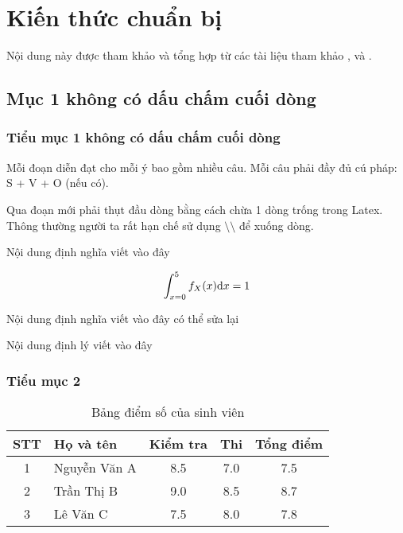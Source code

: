 \chapter{Kiến thức chuẩn bị}
Nội dung này được tham khảo và tổng hợp từ các tài liệu tham khảo \cite{nguyen1999}, \cite{tran_nguyen1982} và \cite{casella2002}. 


\section{Mục 1 không có dấu chấm cuối dòng}
\subsection{Tiểu mục 1 không có dấu chấm cuối dòng}

Mỗi đoạn diễn đạt cho mỗi ý bao gồm nhiều câu. Mỗi câu phải đầy đủ cú pháp: S + V + O (nếu có).

Qua đoạn mới phải thụt đầu dòng bằng cách chừa 1 dòng trống trong Latex. Thông thường người ta rất hạn chế sử dụng $\setminus\setminus$ để xuống dòng. 
\begin{dn}
 Nội dung định nghĩa viết vào đây
\end{dn}

\[ \int_{x=0}^5 f_X (x) {\rm d}x=1 \]

\begin{dn}
 Nội dung định nghĩa viết vào đây có thể sửa lại
\end{dn}

\begin{dl}
 Nội dung định lý viết vào đây   
\end{dl}


\subsection{Tiểu mục 2}

\begin{table}[ht]
    \centering
    \caption{Bảng điểm số của sinh viên}
    \label{tab:diem_sinh_vien}
    \begin{tabular}{|c|l|c|c|c|}
    \hline
     \textbf{STT} & \textbf{Họ và tên} & \textbf{Kiểm tra} & \textbf{Thi} & \textbf{Tổng điểm}\\
      \hline
     1 & Nguyễn Văn A & 8.5 & 7.0 & 7.5 \\
      \hline
     2 & Trần Thị B & 9.0 & 8.5 & 8.7 \\
       \hline
     3 & Lê Văn C & 7.5 & 8.0 & 7.8 \\
       \hline
    \end{tabular} 
\end{table}

